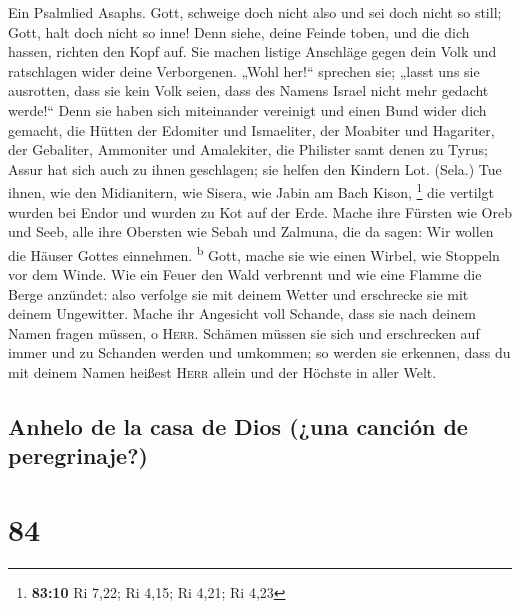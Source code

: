  Ein Psalmlied Asaphs.  Gott, schweige doch
nicht also und sei doch nicht so still; Gott, halt doch nicht so inne!
 Denn siehe, deine Feinde toben, und die dich hassen,
richten den Kopf auf.  Sie machen listige Anschläge gegen
dein Volk und ratschlagen wider deine Verborgenen.  „Wohl
her!{}`` sprechen sie; „lasst uns sie ausrotten, dass sie kein Volk
seien, dass des Namens Israel nicht mehr gedacht werde!{}``
 Denn sie haben sich miteinander vereinigt und einen Bund
wider dich gemacht,  die Hütten der Edomiter und
Ismaeliter, der Moabiter und Hagariter,  der Gebaliter,
Ammoniter und Amalekiter, die Philister samt denen zu Tyrus;
 Assur hat sich auch zu ihnen geschlagen; sie helfen den
Kindern Lot. (Sela.)  Tue ihnen, wie den Midianitern, wie
Sisera, wie Jabin am Bach Kison, \footnote{\textbf{83:10} Ri 7,22; Ri
  4,15; Ri 4,21; Ri 4,23}  die vertilgt wurden bei Endor
und wurden zu Kot auf der Erde.  Mache ihre Fürsten wie
Oreb und Seeb, alle ihre Obersten wie Sebah und Zalmuna, 
die da sagen: Wir wollen die Häuser Gottes einnehmen.
\textsuperscript{b}  Gott, mache sie wie einen Wirbel,
wie Stoppeln vor dem Winde.  Wie ein Feuer den Wald
verbrennt und wie eine Flamme die Berge anzündet:  also
verfolge sie mit deinem Wetter und erschrecke sie mit deinem Ungewitter.
 Mache ihr Angesicht voll Schande, dass sie nach deinem
Namen fragen müssen, o \textsc{Herr}.  Schämen müssen sie
sich und erschrecken auf immer und zu Schanden werden und umkommen;
 so werden sie erkennen, dass du mit deinem Namen heißest
\textsc{Herr} allein und der Höchste in aller Welt.

\hypertarget{anhelo-de-la-casa-de-dios-una-canciuxf3n-de-peregrinaje}{%
\subsection{Anhelo de la casa de Dios (¿una canción de
peregrinaje?)}\label{anhelo-de-la-casa-de-dios-una-canciuxf3n-de-peregrinaje}}

\hypertarget{section-83}{%
\section{84}\label{section-83}}

